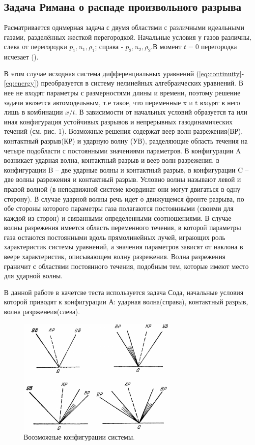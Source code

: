 \documentclass[a4paper,12pt]{extarticle}
\begin{document}
\subsection{Задача Римана о распаде произвольного разрыва}

Расматривается однмерная задача с двумя областями с различными идеальными газами, разделённых жесткой перегородкой. Начальные условия у газов различны, слева от перегородки $p_1, u_1, \rho_1$; справа - $p_2, u_2, \rho_2$.В момент $t=0 $ перегородка исчезает (\cite{BulatVolkov2015,zr1968}).

В этом случае исходная система дифференциальных уравнений (\ref{eq:continuity}-\ref{eq:energy}) преобразуется в систему нелинейных алгебраических уравнений. В нее не входят параметры с размерностями длины и времени, поэтому решение задачи является автомодельным, т.е такое, что переменные x и t входят в него лишь в комбинации \(x/t\).
В зависимости от начальных условий образуется та или иная
конфигурация устойчивых разрывов и непрерывных газодинамических течений (см. рис. 1). Возможные
решения содержат веер волн разрежения(ВР), контактный разрыв(КР) и ударную волну (УВ), разделяющие область
течения на четыре подобласти с постоянными значениями параметров. В конфигурации A возникает
ударная волна, контактный разрыв и веер волн разрежения, в конфигурации B – две ударные волны и
контактный разрыв, в конфигурации C – две волны разрежения и контактный разрыв. Условно волны
называют левой и правой волной (в неподвижной системе координат они могут двигаться в одну сторону). В случае ударной волны речь идет о движущемся фронте разрыва, по обе стороны которого параметры газа полагаются постоянными (своими для каждой из сторон) и связанными определенными соотношениями. В случае волны разрежения имеется область переменного течения, в которой параметры газа
остаются постоянными вдоль прямолинейных лучей, играющих роль характеристик системы уравнений,
а значения параметров зависят от наклона в веере характеристик, описывающем волну разрежения. Волна разрежения граничит с областями постоянного течения, подобным тем, которые имеют место для
ударной волны. 

В данной работе в качетсве теста используется задача Сода, начальные условия которой приводят к конфигурации А: ударная волна(справа), контактный разрыв, волна разрженеия(слева).
\begin{figure}[!htb]
	\centering
	\includegraphics[width=0.7\textwidth]{godunov1976_fig13-1.png}
	\caption{
		Воозможные конфигурации системы.
	}
	\label{fig:configurations}
\end{figure}
\end{document}
